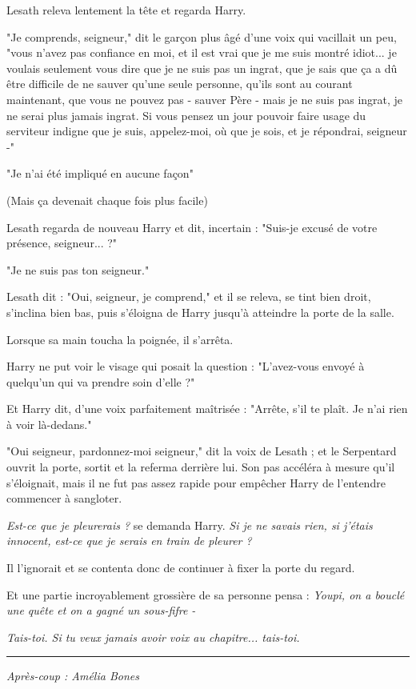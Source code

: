 Lesath releva lentement la tête et regarda Harry.

"Je comprends, seigneur," dit le garçon plus âgé d'une voix qui vacillait un peu, "vous n'avez pas confiance en moi, et il est vrai que je me suis montré idiot... je voulais seulement vous dire que je ne suis pas un ingrat, que je sais que ça a dû être difficile de ne sauver qu'une seule personne, qu'ils sont au courant maintenant, que vous ne pouvez pas - sauver Père - mais je ne suis pas ingrat, je ne serai plus jamais ingrat. Si vous pensez un jour pouvoir faire usage du serviteur indigne que je suis, appelez-moi, où que je sois, et je répondrai, seigneur -"

"Je n'ai été impliqué en aucune façon"

(Mais ça devenait chaque fois plus facile)

Lesath regarda de nouveau Harry et dit, incertain : "Suis-je excusé de votre présence, seigneur... ?"

"Je ne suis pas ton seigneur."

Lesath dit : "Oui, seigneur, je comprend," et il se releva, se tint bien droit, s'inclina bien bas, puis s'éloigna de Harry jusqu'à atteindre la porte de la salle.

Lorsque sa main toucha la poignée, il s'arrêta.

Harry ne put voir le visage qui posait la question : "L'avez-vous envoyé à quelqu'un qui va prendre soin d'elle ?"

Et Harry dit, d'une voix parfaitement maîtrisée : "Arrête, s'il te plaît. Je n'ai rien à voir là-dedans."

"Oui seigneur, pardonnez-moi seigneur," dit la voix de Lesath ; et le Serpentard ouvrit la porte, sortit et la referma derrière lui. Son pas accéléra à mesure qu'il s'éloignait, mais il ne fut pas assez rapide pour empêcher Harry de l'entendre commencer à sangloter.

\emph{Est-ce que je pleurerais ? } se demanda Harry. \emph{Si je ne savais rien, si j'étais innocent, est-ce que je serais en train de pleurer ?} 

Il l'ignorait et se contenta donc de continuer à fixer la porte du regard.

Et une partie incroyablement grossière de sa personne pensa : \emph{Youpi, on a bouclé une quête et on a gagné un sous-fifre -} 

\emph{Tais-toi. Si tu veux jamais avoir voix au chapitre... tais-toi.} 
\par\noindent\rule{\textwidth}{0.4pt}
\emph{Après-coup : Amélia Bones} 

